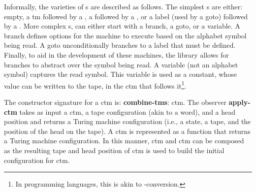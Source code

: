 \documentclass{eptcs}
\begin{document}
\noindent Informally, the varieties of s are described as follows. The simplest s are either: empty, a \textsf{tm} followed by a , a  followed by a , or a label (used by a goto) followed by a . More complex s, can either start with a branch, a goto, or a variable. A branch defines options for the machine to execute based on the alphabet symbol being read. A goto unconditionally branches to a label that must be defined. Finally, to aid in the development of these machines, the library allows for branches to abstract over the symbol being read. A variable (not an alphabet symbol) captures the read symbol. This variable is used as a constant, whose value  can be written to the tape, in the \textsf{ctm} that follows it\footnote{In programming languages, this is akin to -conversion.}.

The constructor signature for a \textsf{ctm} is: \textbf{combine-tms}:    \textsf{ctm}. The observer \textbf{apply-ctm} takes as input a \textsf{ctm}, a tape configuration (akin to a word), and a head position and returns a Turing machine configuration (i.e., a state, a tape, and the position of the head on the tape). A \textsf{ctm} is represented as a function that returns a Turing machine configuration. In this manner, \textsf{ctm} and \textsf{ctm} can be composed as the resulting tape and head position of \textsf{ctm} is used to build the initial configuration for \textsf{ctm}.
\end{document}
